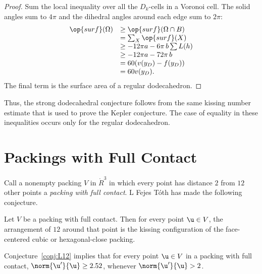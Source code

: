 \begin{proof} 
  Sum the local inequality over all the $D_k$-cells in a Voronoi cell.
  The solid angles sum to $4\pi$ and the dihedral angles around each
  edge sum to $2\pi$:
\begin{displaymath}
\begin{array}{lll}
\op{surf}(\Omega) &\ge \op{surf}(\Omega\cap B)\\
&=\sum_X \op{surf}(X)\\
&\ge -12\pi a - 6\pi\, b  \sum L(h)\\
&\ge -12\pi a - 72\pi\, b\\
&= 60 (v(y_D) - f(y_D))\\
&= 60 v(y_D).\\
\end{array}
\end{displaymath}
The final term is the surface area of a regular dodecahedron.
\end{proof}

Thus, the strong dodecahedral conjecture follows from the same kissing
number estimate that is used to prove the Kepler conjecture.  The case
of equality in these inequalities occurs only for the regular
dodecahedron.

\section{Packings with Full Contact}



Call a nonempty packing $ V$ in $\ring{R}^3$ in which every point has
distance $2$ from $12$ other points a {\it packing with full
  contact}. L Fejes T\'oth has made the following conjecture.
%
%
%

\begin{conjecture} Let $ V$ be a packing with full
  contact.  Then for every point $ \u\in V$, the arrangement of $12$
  around that point is the kissing configuration of the face-centered
  cubic or hexagonal-close packing.
\end{conjecture}
%
%
%

\begin{lemma} Conjecture~\ref{conj:L12} implies that for
  every point $ \u\in V$ in a packing with full contact, $\norm{ \u'}{
    \u}\ge 2.52$, whenever $\norm{ \u'}{ \u}> 2$.
\end{lemma}
%
%

